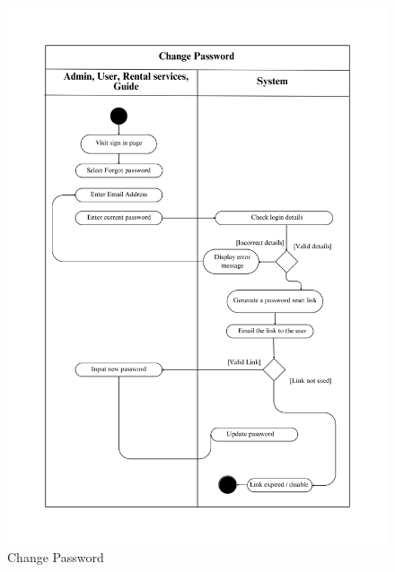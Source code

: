 \begin{figure}[h!]
    \centering
    \includegraphics[width=1\linewidth]{Images/Activity Diagrams/3 Change Password.png}
    \caption{Change Password}
\end{figure}

